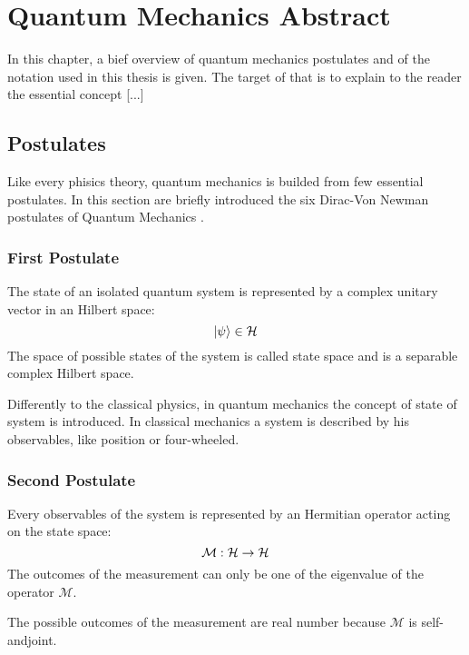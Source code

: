 \chapter{Quantum Mechanics Abstract}
    In this chapter, a bief overview of quantum mechanics postulates and
    of the notation used in this thesis is given. The target of that is 
    to explain to the reader the essential concept [...]

    \section{Postulates}
        Like every phisics theory, quantum mechanics is builded from few 
        essential postulates.
        In this section are briefly introduced the six Dirac-Von Newman 
        postulates of Quantum Mechanics \cite{quantumMec_Dirac}\cite{quantumMec_Neumann}.
        
        \subsection{First Postulate}
        \begin{postulate}
            The state of an isolated quantum system is represented by a complex unitary 
            vector in an Hilbert space:
            \begin{equation*}
                \ket{\psi} \in \mathcal{H}
            \end{equation*}
            The space of possible states of the system is called state space and is a
            separable complex Hilbert space.
            \label{post:1}
        \end{postulate}
        \begin{observation*}
            Differently to the classical physics, in quantum mechanics the concept
            of state of system is introduced. In classical mechanics a system is 
            described by his observables, like position or four-wheeled.
        \end{observation*}
        
        \subsection{Second Postulate}
        \begin{postulate}[Observables]
            Every observables of the system is represented by an Hermitian operator
            acting on the state space:
            \begin{equation*}
                \mathcal{M}:\mathcal{H}\to\mathcal{H}
            \end{equation*}
            The outcomes of the measurement can only be one of the eigenvalue of the 
            operator $\mathcal{M}$.
            \label{post:2}
        \end{postulate}
        \begin{observation*}
            The possible outcomes of the measurement are real number because $\mathcal{M}$
            is self-andjoint. 
        \end{observation*}

